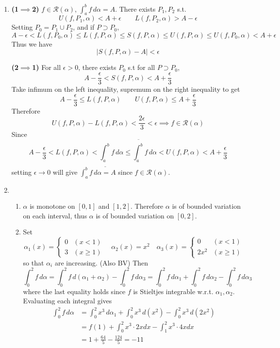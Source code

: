 \documentclass[11pt]{report}
\newcommand{\mc}[1]{\mathcal{#1}}
\newcommand{\ra}{\rightarrow}
\newcommand{\abs}[1]{\left|#1\right|}
\newcommand{\imp}{\implies}
\newcommand{\mimp}{$\implies$}
\renewcommand{\d}{\,d}
\newcommand{\lint}[1]{\underline{\int#1}}
\newcommand{\uint}[1]{\overline{\int#1}}
\begin{document}
\begin{enumerate}
\item \textsf{\textbf{(1\mimp2)}} $f\in \mc{R}(\alpha)$, $\int_a^b f\d\alpha = A$. There exists $P_1, P_2$ s.t.
$$U(f, P_1, \alpha) < A+\epsilon \qquad L(f, P_2, \alpha) > A- \epsilon$$
Setting $P_0 = P_1\cup P_2$, and if $P\supset P_0$,
$$A-\epsilon < L(f, P_0, \alpha) \leq L(f, P, \alpha) \leq S(f, P, \alpha) \leq U(f, P, \alpha) \leq U(f, P_0, \alpha) < A+ \epsilon$$
Thus we have
$$\abs{S(f, P, \alpha) - A} <\epsilon$$

\textsf{\textbf{(2\mimp1)}} For all $\epsilon > 0$, there exists $P_0$ s.t for all $P\supset P_0$, $$A - \frac{\epsilon}{3} < S(f, P, \alpha) < A+\frac{\epsilon}{3}$$
Take infimum on the left inequality, supremum on the right inequality to get
$$A-\frac{\epsilon}{3} \leq L(f, P, \alpha) \qquad U(f, P, \alpha) \leq A+\frac{\epsilon}{3}$$
Therefore
$$U(f, P, \alpha) - L(f, P, \alpha) < \frac{2\epsilon}{3} <\epsilon \imp f\in \mc{R}(\alpha)$$
Since
$$ A - \frac{\epsilon}{3} < L(f, P, \alpha) < \lint{_a^b} f\d\alpha \leq \uint{_a^b}f\d\alpha < U(f, P, \alpha) < A + \frac{\epsilon}{3}$$
setting $\epsilon\ra 0$ will give $\int_a^b f\d\alpha = A$ since $f\in \mc{R}(\alpha)$.


\item 
\begin{enumerate}
	\item $\alpha$ is monotone on $[0, 1]$ and $[1, 2]$. Therefore $\alpha$ is of bounded variation on each interval, thus $\alpha$ is of bounded variation on $[0, 2]$.
	\item Set
	$$\alpha_1(x) = \begin{cases}
	0& (x < 1) \\ 3 & (x\geq 1)
	\end{cases} \quad \alpha_2(x) = x^2 \quad \alpha_3(x) = \begin{cases}
		0 & (x < 1) \\ 2x^2 & (x \geq 1)
	\end{cases}$$
	so that $\alpha_i$ are increasing. (Also BV) Then $$\int_0^2 f\d\alpha = \int_0^2 f \d(\alpha_1 + \alpha_2) - \int_0^2 f\d\alpha_3 = \int_0^2 f \d\alpha_1 + \int_0^2 f \d\alpha_2 - \int_0^2 f\d\alpha_3$$
	where the last equality holds since $f$ is Stieltjes integrable w.r.t. $\alpha_1, \alpha_2$.
	Evaluating each integral gives
	$$\begin{aligned}
	\int_0^2 f\d\alpha &= \int_0^2 x^3 \d\alpha_1 + \int_0^2 x^3 \d(x^2) - \int_0^2 x^3 \d(2x^2) \\
	&=f(1) + \int_0^2 x^3\cdot 2xdx  - \int_1^2 x^3\cdot 4xdx\\
	&=1 + \frac{64}{5} - \frac{124}{5} = -11
	\end{aligned}$$
\end{enumerate}
\end{enumerate}
\end{document}
